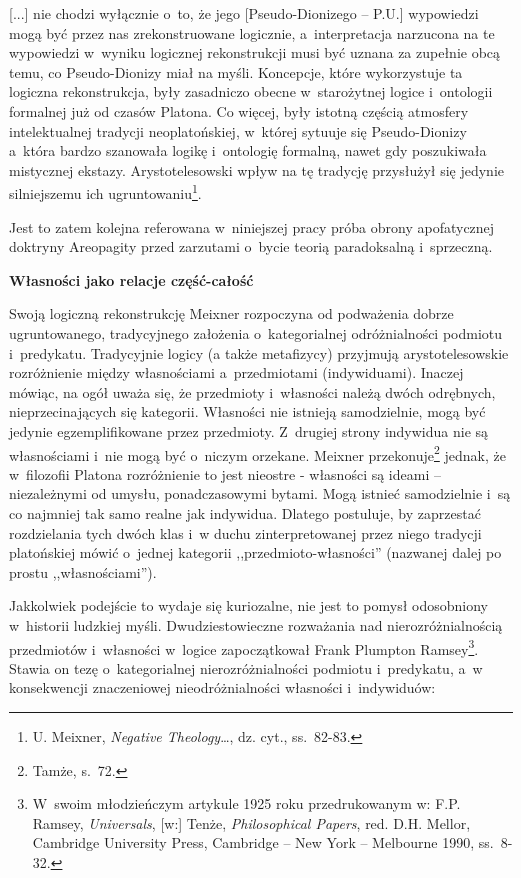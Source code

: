 [...] nie chodzi wyłącznie o~to, że jego [Pseudo-Dionizego -- P.U.] wypowiedzi mogą być przez nas zrekonstruowane logicznie, a~interpretacja narzucona na te wypowiedzi w~wyniku logicznej rekonstrukcji musi być uznana za zupełnie obcą temu, co Pseudo-Dionizy miał na myśli. Koncepcje, które wykorzystuje ta logiczna rekonstrukcja, były zasadniczo obecne w~starożytnej logice i~ontologii formalnej już od czasów Platona. Co więcej, były istotną częścią atmosfery intelektualnej tradycji neoplatońskiej, w~której sytuuje się Pseudo-Dionizy a~która bardzo szanowała logikę i~ontologię formalną, nawet gdy poszukiwała mistycznej ekstazy. Arystotelesowski wpływ na tę tradycję przysłużył się jedynie silniejszemu ich ugruntowaniu\footnote{ U. Meixner, \textit{Negative Theology}…, dz. cyt., ss.~82-83.}.

Jest to zatem kolejna referowana w~niniejszej pracy próba obrony apofatycznej doktryny Areopagity przed zarzutami o~bycie teorią paradoksalną i~sprzeczną.

\textbf{Własności jako relacje część-całość}

Swoją logiczną rekonstrukcję Meixner rozpoczyna od podważenia dobrze ugruntowanego, tradycyjnego założenia o~kategorialnej odróżnialności podmiotu i~predykatu. Tradycyjnie logicy (a także metafizycy) przyjmują arystotelesowskie rozróżnienie między własnościami a~przedmiotami (indywiduami). Inaczej mówiąc, na ogół uważa się, że przedmioty i~własności należą dwóch odrębnych, nieprzecinających się kategorii. Własności nie istnieją samodzielnie, mogą być jedynie egzemplifikowane przez przedmioty. Z~drugiej strony indywidua nie są własnościami i~nie mogą być o~niczym orzekane. Meixner przekonuje\footnote{ Tamże, s.~72.} jednak, że w~filozofii Platona rozróżnienie to jest nieostre - własności są ideami -- niezależnymi od umysłu, ponadczasowymi bytami. Mogą istnieć samodzielnie i~są co najmniej tak samo realne jak indywidua. Dlatego postuluje, by zaprzestać rozdzielania tych dwóch klas i~w duchu zinterpretowanej przez niego tradycji platońskiej mówić o~jednej kategorii ,,przedmioto-własności'' (nazwanej dalej po prostu ,,własnościami'').

Jakkolwiek podejście to wydaje się kuriozalne, nie jest to pomysł odosobniony w~historii ludzkiej myśli. Dwudziestowieczne rozważania nad nierozróżnialnością przedmiotów i~własności w~logice zapoczątkował Frank Plumpton Ramsey\footnote{ W~swoim młodzieńczym artykule 1925 roku przedrukowanym w: F.P. Ramsey, \textit{Universals}, [w:] Tenże, \textit{Philosophical Papers}, red. D.H. Mellor, Cambridge University Press, Cambridge -- New York -- Melbourne 1990, ss.~8-32.}. Stawia on tezę o~kategorialnej nierozróżnialności podmiotu i~predykatu, a~w konsekwencji znaczeniowej nieodróżnialności własności i~indywiduów:

